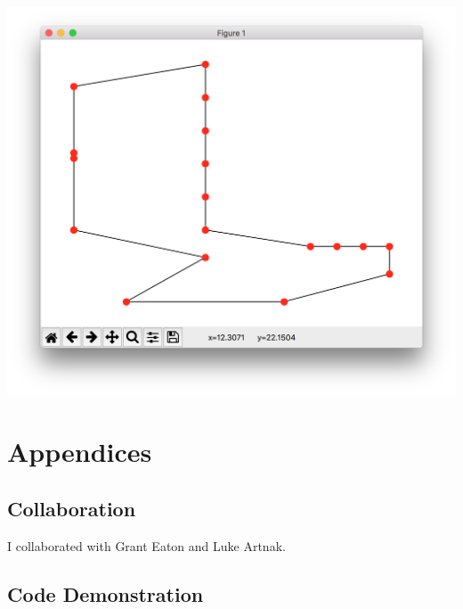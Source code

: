 \documentclass[11pt,fleqn]{article}
\begin{document}
\centering
\includegraphics[scale=0.5]{plot.png}


\newpage
\appendix
\section*{Appendices}
\renewcommand{\thesubsection}{\Alph{subsection}}

\subsection{Collaboration}
  I collaborated with Grant Eaton and Luke Artnak.

\newpage
\subsection{Code Demonstration}
  \inputminted[frame=lines,linenos=true]{python}{../src/brute_force.py}

\newpage


\end{document}
